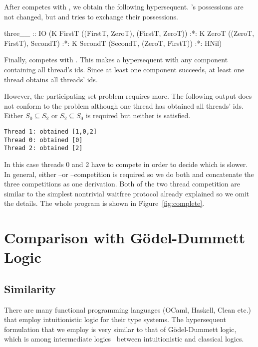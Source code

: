 After \verb@SecondT@ competes with \verb@ZeroT@, we obtain the following
hypersequent.  \verb@FirstT@'s possessions are not changed, but \verb@ZeroT@ and
\verb@SecondT@ tries to exchange their possessions.
\begin{spec}
three__ :: IO
  (K FirstT ((FirstT, ZeroT), (FirstT, ZeroT)) :*:
   K ZeroT ((ZeroT, FirstT), SecondT) :*:
   K SecondT (SecondT, (ZeroT, FirstT)) :*: HNil)
\end{spec}
Finally, \verb@SecondT@ competes with \verb@FirstT@.  This makes a hypersequent with
any component containing all thread's ids.  Since at least one component succeeds,
at least one thread obtains all threads' ids.

However, the participating set problem requires more.  The following
output does not conform to the problem although one thread has obtained
all threads' ids.  Either $S_0 \subseteq S_2$ or $S_2\subseteq S_0$ is
required but neither is satisfied.
\begin{verbatim}
Thread 1: obtained [1,0,2]
Thread 0: obtained [0]
Thread 2: obtained [2]
\end{verbatim}
In this case threads 0 and 2 have to compete in order to decide which
is slower.  In general, either \verb@ZeroT@--\verb@SecondT@ or
\verb@FirstT@--\verb@SecondT@ competition is required so we do both and
concatenate the three competitions as one derivation.
Both of the two thread competition are similar to the simplest nontrivial
waitfree protocol already explained so we omit the details.  The whole
program is shown in Figure~\ref{fig:complete}.


\section{Comparison with G\"odel-Dummett Logic}


\subsection{Similarity}

There are many functional programming languages (OCaml, Haskell, Clean
etc.) that employ intuitionistic logic for their type systems.
The hypersequent formulation that we employ is very similar to that of
G\"odel-Dummett logic, which is among
intermediate logics~\citep{umezawa} between intuitionistic and
classical logics.

